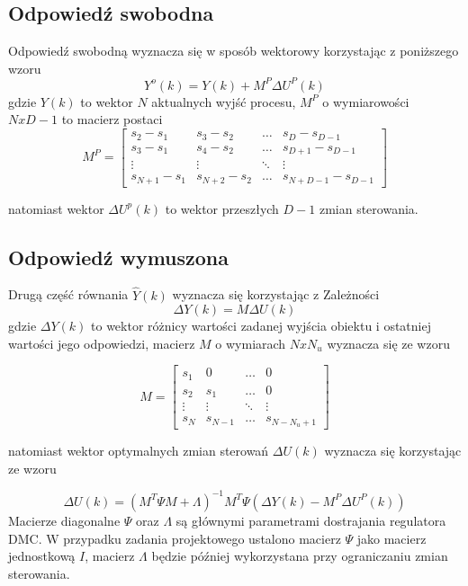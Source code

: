 \documentclass[fleqn]{article}
\begin{document}
\subsection{Odpowiedź swobodna}

Odpowiedź swobodną wyznacza się w sposób wektorowy korzystając z poniższego wzoru
{\Large
\begin{equation}
	 Y^o (k) = Y(k) + M^P \Delta U^P (k)
\end{equation}
}
gdzie $Y(k)$ to wektor $N$ aktualnych wyjść procesu, $M^P$ o wymiarowości $NxD-1$ to macierz postaci
{\Large
\begin{equation}
	M^P=\begin{bmatrix}
		s_2-s_1 & s_3-s_2 & \dots & s_D-s_{D-1}\\
		s_3-s_1 & s_4-s_2 & \dots & s_{D+1}-s_{D-1}\\
		\vdots & \vdots & \ddots & \vdots \\
		s_{N+1}-s_1 & s_{N+2}-s_2 & \dots	& s_{N+D-1}-s_{D-1}
	\end{bmatrix}
\end{equation}
}

natomiast wektor $\Delta U^p(k)$ to wektor przeszłych $D-1$ zmian sterowania.

\subsection{Odpowiedź wymuszona}

Drugą część równania $\hat{Y}(k)$ wyznacza się korzystając z Zależności
{\Large
\begin{equation}
	\Delta Y(k)=M\Delta U(k)
\end{equation}
}
gdzie $\Delta Y(k)$ to wektor różnicy wartości zadanej wyjścia obiektu i ostatniej wartości jego odpowiedzi, macierz $M$ o wymiarach $NxN_u$ wyznacza się ze wzoru

{\Large
\begin{equation}
	M=\begin{bmatrix}
		s_1 & 0 & \dots & 0 \\
		s_2 & s_1 & \dots & 0 \\
		\vdots & \vdots & \ddots & \vdots \\
		s_N & s_{N-1} & \dots & s_{N-N_u+1}
\end{bmatrix}
\end{equation}
}

natomiast wektor optymalnych zmian sterowań $\Delta U(k)$ wyznacza się korzystając ze wzoru

{\Large
\begin{equation}
	\Delta U(k)=(M^T\Psi M+\Lambda)^{-1}M^T\Psi (\Delta Y(k)-M^P\Delta U^P(k))
\end{equation}
}
Macierze diagonalne $\Psi$ oraz $\Lambda$ są głównymi parametrami dostrajania regulatora DMC. W przypadku zadania projektowego ustalono macierz $\Psi$ jako macierz jednostkową $I$, macierz $\Lambda$ będzie później wykorzystana przy ograniczaniu zmian sterowania.
\end{document}
